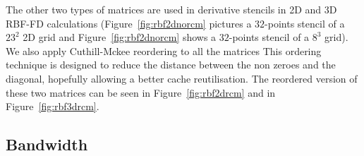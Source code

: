 \documentclass[10pt,conference,compsocconf]{IEEEtran}
\begin{document}
The other two types of matrices are used in derivative stencils in 2D
and 3D RBF-FD calculations (Figure~\ref{fig:rbf2dnorcm} pictures a
$32$-points stencil of a $23^2$ 2D grid and
Figure~\ref{fig:rbf2dnorcm} shows a $32$-points stencil of a $8^3$
grid). We also apply Cuthill-Mckee reordering to all the matrices This
ordering technique is designed to reduce the distance between the non
zeroes and the diagonal, hopefully allowing a better cache
reutilisation. The reordered version of these two matrices can be seen
in Figure~\ref{fig:rbf2drcm} and in Figure~\ref{fig:rbf3drcm}.


\subsection{Bandwidth}

\begin{figure}

%


\end{figure}
\end{document}
